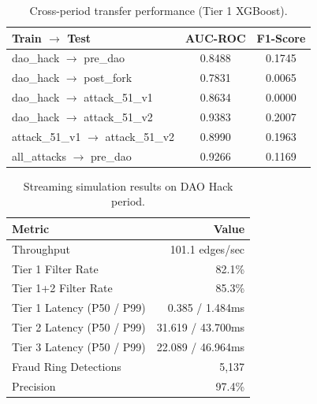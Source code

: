 \begin{table}[t]
\centering
\caption{Cross-period transfer performance (Tier 1 XGBoost).}
\label{tab:cross_period}
\begin{tabular}{lcc}
\toprule
\textbf{Train $\to$ Test} & \textbf{AUC-ROC} & \textbf{F1-Score} \\
\midrule
dao\_hack $\to$ pre\_dao & 0.8488 & 0.1745 \\
dao\_hack $\to$ post\_fork & 0.7831 & 0.0065 \\
dao\_hack $\to$ attack\_51\_v1 & 0.8634 & 0.0000 \\
dao\_hack $\to$ attack\_51\_v2 & 0.9383 & 0.2007 \\
attack\_51\_v1 $\to$ attack\_51\_v2 & 0.8990 & 0.1963 \\
all\_attacks $\to$ pre\_dao & 0.9266 & 0.1169 \\
\bottomrule
\end{tabular}
\end{table}

\begin{table}[t]
\centering
\caption{Streaming simulation results on DAO Hack period.}
\label{tab:streaming}
\begin{tabular}{lr}
\toprule
\textbf{Metric} & \textbf{Value} \\
\midrule
Throughput & 101.1 edges/sec \\
Tier 1 Filter Rate & 82.1\% \\
Tier 1+2 Filter Rate & 85.3\% \\
Tier 1 Latency (P50 / P99) & 0.385 / 1.484ms \\
Tier 2 Latency (P50 / P99) & 31.619 / 43.700ms \\
Tier 3 Latency (P50 / P99) & 22.089 / 46.964ms \\
Fraud Ring Detections & 5,137 \\
Precision & 97.4\% \\
\bottomrule
\end{tabular}
\end{table}

